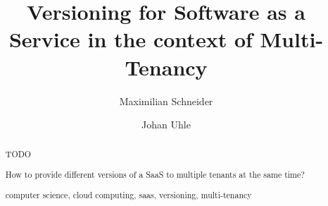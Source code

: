 \documentclass[runningheads,a4paper]{llncs}
\newcommand{\keywords}[1]{\par\addvspace\baselineskip
\noindent\keywordname\enspace\ignorespaces#1}
\begin{document}
\mainmatter  %

\title{Versioning for Software as a Service in the context of Multi-Tenancy}


%
%
\author{Maximilian Schneider \and Johan Uhle}
%


%
%

\maketitle


\begin{abstract}
TODO

How to provide different versions of a SaaS to multiple tenants at the same time?

\keywords{computer science, cloud computing, saas, versioning, multi-tenancy}
\end{abstract}








{}

\end{document}
